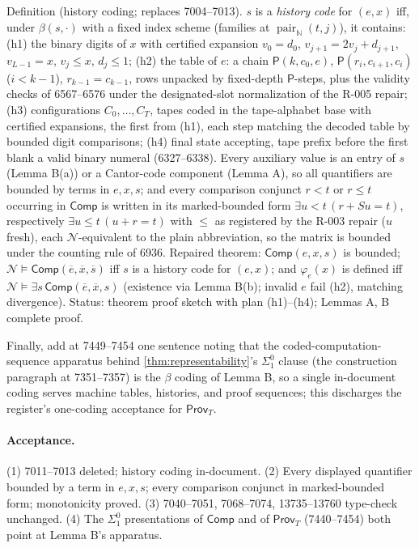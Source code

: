 Definition (history coding; replaces 7004--7013).  \(s\) is a \emph{history code} for \((e,x)\) iff, under \(\beta(s,\cdot)\) with a fixed index scheme (families at \(\operatorname{pair}_{\mathbb N}(t,j)\)), it contains: (h1) the binary digits of \(x\) with certified expansion \(v_0=d_0\), \(v_{j+1}=2v_j+d_{j+1}\), \(v_{L-1}=x\), \(v_j\le x\), \(d_j\le1\); (h2) the table of \(e\): a chain \(\mathsf P(k,c_0,e)\), \(\mathsf P(r_i,c_{i+1},c_i)\) (\(i<k-1\)), \(r_{k-1}=c_{k-1}\), rows unpacked by fixed-depth \(\mathsf P\)-steps, plus the validity checks of 6567--6576 under the designated-slot normalization of the R-005 repair; (h3) configurations \(C_0,\dots,C_T\), tapes coded in the tape-alphabet base with certified expansions, the first from (h1), each step matching the decoded table by bounded digit comparisons; (h4) final state accepting, tape prefix before the first blank a valid binary numeral (6327--6338).  Every auxiliary value is an entry of \(s\) (Lemma B(a)) or a Cantor-code component (Lemma A), so all quantifiers are bounded by terms in \(e,x,s\); and every comparison conjunct \(r<t\) or \(r\leq t\) occurring in \(\mathsf{Comp}\) is written in its marked-bounded form \(\exists u<t\,(r+Su=t)\), respectively \(\exists u\leq t\,(u+r=t)\) with \(\leq\) as registered by the R-003 repair (\(u\) fresh), each \(\mathcal N\)-equivalent to the plain abbreviation, so the matrix is bounded under the counting rule of 6936.  Repaired theorem: \(\mathsf{Comp}(e,x,s)\) is bounded; \(\mathcal N\models\mathsf{Comp}(\overline e,\overline x,\overline s)\) iff \(s\) is a history code for \((e,x)\); and \(\varphi_e(x)\) is defined iff \(\mathcal N\models\exists s\,\mathsf{Comp}(\overline e,\overline x,s)\) (existence via Lemma B(b); invalid \(e\) fail (h2), matching divergence).  Status: theorem proof sketch with plan (h1)--(h4); Lemmas A, B complete proof.

Finally, add at 7449--7454 one sentence noting that the coded-computation-sequence apparatus behind \cref{thm:representability}'s \(\Sigma^0_1\) clause (the construction paragraph at 7351--7357) is the \(\beta\) coding of Lemma B, so a single in-document coding serves machine tables, histories, and proof sequences; this discharges the register's one-coding acceptance for \(\mathsf{Prov}_T\).

\paragraph{Acceptance.} (1) 7011--7013 deleted; history coding in-document.  (2) Every displayed quantifier bounded by a term in \(e,x,s\); every comparison conjunct in marked-bounded form; monotonicity proved.  (3) 7040--7051, 7068--7074, 13735--13760 type-check unchanged.  (4) The \(\Sigma^0_1\) presentations of \(\mathsf{Comp}\) and of \(\mathsf{Prov}_T\) (7440--7454) both point at Lemma B's apparatus.

